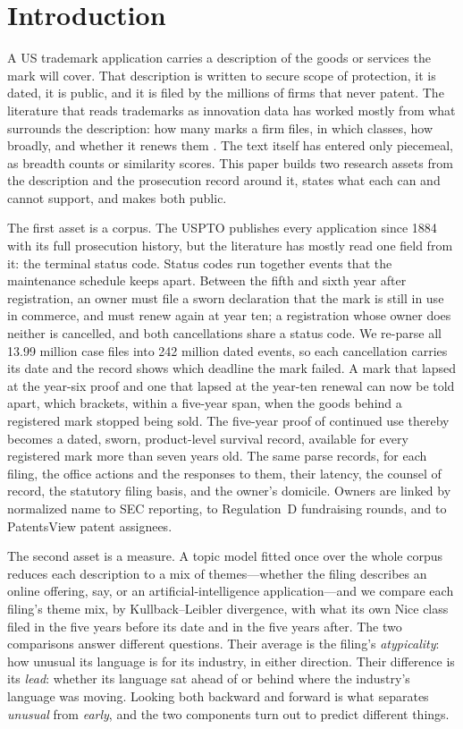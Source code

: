 \section{Introduction}\label{sec:intro}

A US trademark application carries a description of the goods or services
the mark will cover. That description is written to secure scope of
protection, it is dated, it is public, and it is filed by the millions of
firms that never patent. The literature that reads trademarks as
innovation data has worked mostly from what surrounds the description:
how many marks a firm files, in which classes, how broadly, and whether
it renews them \citep{Castaldi2020, Flikkema2019, Dinlersoz2018}. The
text itself has entered only piecemeal, as breadth counts or similarity
scores. This paper builds two research assets from the description and
the prosecution record around it, states what each can and cannot
support, and makes both public.

The first asset is a corpus. The USPTO publishes every application since
1884 with its full prosecution history, but the literature has mostly
read one field from it: the terminal status code. Status codes run
together events that the maintenance schedule keeps apart. Between the
fifth and sixth year after registration, an owner must file a sworn
declaration that the mark is still in use in commerce, and must renew
again at year ten; a registration whose owner does neither is cancelled,
and both cancellations share a status code. We re-parse all 13.99 million
case files into 242 million dated events, so each cancellation carries
its date and the record shows which deadline the mark failed. A mark that
lapsed at the year-six proof and one that lapsed at the year-ten renewal
can now be told apart, which brackets, within a five-year span, when the
goods behind a registered mark stopped being sold. The five-year proof of
continued use thereby becomes a dated, sworn, product-level survival
record, available for every registered mark more than seven years old.
The same parse records, for each filing, the office actions and the
responses to them, their latency, the counsel of record, the statutory
filing basis, and the owner's domicile. Owners are linked by normalized
name to SEC reporting, to Regulation~D fundraising rounds, and to
PatentsView patent assignees.

The second asset is a measure. A topic model fitted once over the whole
corpus reduces each description to a mix of themes---whether the filing
describes an online offering, say, or an artificial-intelligence
application---and we compare each filing's theme mix, by
Kullback--Leibler divergence, with what its own Nice class filed in the
five years before its date and in the five years after. The two
comparisons answer different questions. Their average is the filing's
\emph{atypicality}: how unusual its language is for its industry, in
either direction. Their difference is its \emph{lead}: whether its
language sat ahead of or behind where the industry's language was moving.
Looking both backward and forward is what separates \emph{unusual} from
\emph{early}, and the two components turn out to predict different
things.

